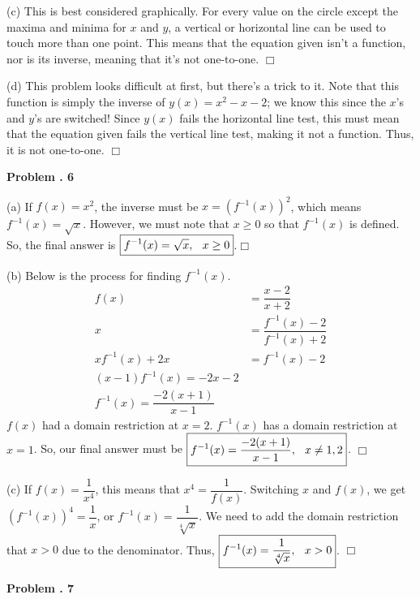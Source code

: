 \documentclass[lang=en,11pt]{elegantbook}
\begin{document}
(c) This is best considered graphically.  For every value on the circle except the maxima and minima for $x$ and $y$, a vertical or horizontal line can be used to touch more than one point.  This means that the equation given isn't a function, nor is its inverse, meaning that it's $\boxed{\text{not one-to-one}}$. $\Box$

(d) This problem looks difficult at first, but there's a trick to it.  Note that this function is simply the inverse of $y(x)=x^2-x-2$; we know this since the $x$'s and $y$'s are switched!  Since $y(x)$ fails the horizontal line test, this must mean that the equation given fails the vertical line test, making it not a function.  Thus, it is $\boxed{\text{not one-to-one}}$. $\Box$ \vspace{3mm}

\noindent \textbf{Problem . 6}

(a) If $f(x)=x^2$, the inverse must be $x=\left(f^{-1}(x)\right)^2$, which means $f^{-1}(x)=\sqrt{x}$.  However, we must note that $x\geq 0$ so that $f^{-1}(x)$ is defined.   So, the final answer is $\boxed{f^{-1}(x)=\sqrt{x}, \hspace{0.1in} x\geq 0}$.$\Box$

(b) Below is the process for finding $f^{-1}(x)$. \begin{align*}
    f(x)&=\dfrac{x-2}{x+2} \\ x&=\dfrac{f^{-1}(x)-2}{f^{-1}(x)+2} \\ xf^{-1}(x)+2x&=f^{-1}(x)-2 \\ (x-1)f^{-1}(x)=-2x-2 \\ f^{-1}(x)=\dfrac{-2(x+1)}{x-1}
\end{align*}
$f(x)$ had a domain restriction at $x=2$.  $f^{-1}(x)$ has a domain restriction at $x=1$.  So, our final answer must be $\boxed{f^{-1}(x)=\dfrac{-2(x+1)}{x-1}, \hspace{0.1in} x\neq 1,2}$. $\Box$

(c) If $f(x)=\dfrac{1}{x^4}$, this means that $x^4=\dfrac{1}{f(x)}$.  Switching $x$ and $f(x)$, we get $\left(f^{-1}(x)\right)^4=\dfrac{1}{x}$, or $f^{-1}(x)=\dfrac{1}{\sqrt[4]{x}}$.  We need to add the domain restriction that $x>0$ due to the denominator.  Thus, $\boxed{f^{-1}(x)=\dfrac{1}{\sqrt[4]{x}}, \hspace{0.1in} x>0}$. $\Box$

\noindent \textbf{Problem . 7}
\end{document}
